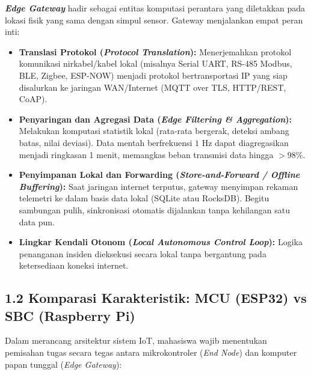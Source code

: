 \documentclass[11pt,a4paper]{article}
\begin{document}
\textbf{\textit{Edge Gateway}} hadir sebagai entitas komputasi perantara yang diletakkan pada lokasi fisik yang sama dengan simpul sensor. Gateway menjalankan empat peran inti:
\begin{itemize}
    \item \textbf{Translasi Protokol (\textit{Protocol Translation}):} Menerjemahkan protokol komunikasi nirkabel/kabel lokal (misalnya Serial UART, RS-485 Modbus, BLE, Zigbee, ESP-NOW) menjadi protokol bertransportasi IP yang siap disalurkan ke jaringan WAN/Internet (MQTT over TLS, HTTP/REST, CoAP).
    \item \textbf{Penyaringan dan Agregasi Data (\textit{Edge Filtering \& Aggregation}):} Melakukan komputasi statistik lokal (rata-rata bergerak, deteksi ambang batas, nilai deviasi). Data mentah berfrekuensi $1\text{ Hz}$ dapat diagregasikan menjadi ringkasan 1 menit, memangkas beban transmisi data hingga $>98\%$.
    \item \textbf{Penyimpanan Lokal dan Forwarding (\textit{Store-and-Forward / Offline Buffering}):} Saat jaringan internet terputus, gateway menyimpan rekaman telemetri ke dalam basis data lokal (SQLite atau RocksDB). Begitu sambungan pulih, sinkronisasi otomatis dijalankan tanpa kehilangan satu data pun.
    \item \textbf{Lingkar Kendali Otonom (\textit{Local Autonomous Control Loop}):} Logika penanganan insiden dieksekusi secara lokal tanpa bergantung pada ketersediaan koneksi internet.
\end{itemize}

\subsection*{1.2 Komparasi Karakteristik: MCU (ESP32) vs SBC (Raspberry Pi)}
Dalam merancang arsitektur sistem IoT, mahasiswa wajib menentukan pemisahan tugas secara tegas antara mikrokontroler (\textit{End Node}) dan komputer papan tunggal (\textit{Edge Gateway}):
\end{document}
